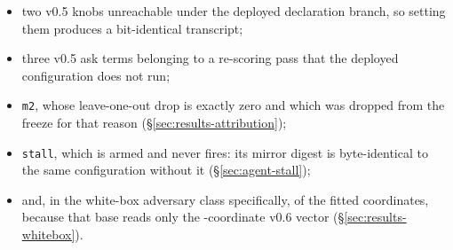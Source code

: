 \begin{itemize}
\item two v0.5 knobs unreachable under the deployed declaration branch, so setting them produces a
      bit-identical transcript;
\item three v0.5 ask terms belonging to a re-scoring pass that the deployed configuration does
      not run;
\item \texttt{m2}, whose leave-one-out drop is exactly zero and which was dropped from the freeze
      for that reason (\S\ref{sec:results-attribution});
\item \texttt{stall}, which is armed and never fires: its mirror digest is byte-identical to the
      same configuration without it (\S\ref{sec:agent-stall});
\item and, in the white-box adversary class specifically, \vsevenZeightInert{} of the
      \vsevenCoordinates{} fitted coordinates, because that base reads only the
      \vsevenVsixCoords{}-coordinate v0.6 vector (\S\ref{sec:results-whitebox}).
\end{itemize}
